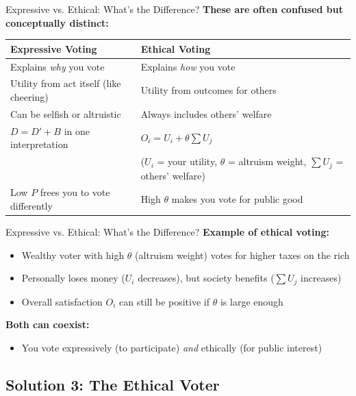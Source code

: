 \documentclass[10pt]{beamer}
\begin{document}
\begin{frame}{Expressive vs. Ethical: What's the Difference?}
\textbf{These are often confused but conceptually distinct:}

\begin{table}
\centering
\footnotesize
\begin{tabular}{p{4cm}p{5cm}}
\toprule
\textbf{Expressive Voting} & \textbf{Ethical Voting} \\
\midrule
Explains \emph{why} you vote & Explains \emph{how} you vote \\
\midrule
Utility from act itself (like cheering) & Utility from outcomes for others \\
\midrule
Can be selfish or altruistic & Always includes others' welfare \\
\midrule
$D = D' + B$ in one interpretation & $O_i = U_i + \theta \sum U_j$ \\
& \footnotesize{($U_i$ = your utility, $\theta$ = altruism weight, $\sum U_j$ = others' welfare)} \\
\midrule
Low $P$ frees you to vote differently & High $\theta$ makes you vote for public good \\
\bottomrule
\end{tabular}
\end{table}
\end{frame}

\begin{frame}{Expressive vs. Ethical: What's the Difference?}
\textbf{Example of ethical voting:}
\begin{itemize}
\item Wealthy voter with high $\theta$ (altruism weight) votes for higher taxes on the rich
\item Personally loses money ($U_i$ decreases), but society benefits ($\sum U_j$ increases)
\item Overall satisfaction $O_i$ can still be positive if $\theta$ is large enough
\end{itemize}

\textbf{Both can coexist:}
\begin{itemize}
\item You vote expressively (to participate) \emph{and} ethically (for public interest)
\end{itemize}
\end{frame}

\subsection{Solution 3: The Ethical Voter}
\end{document}
